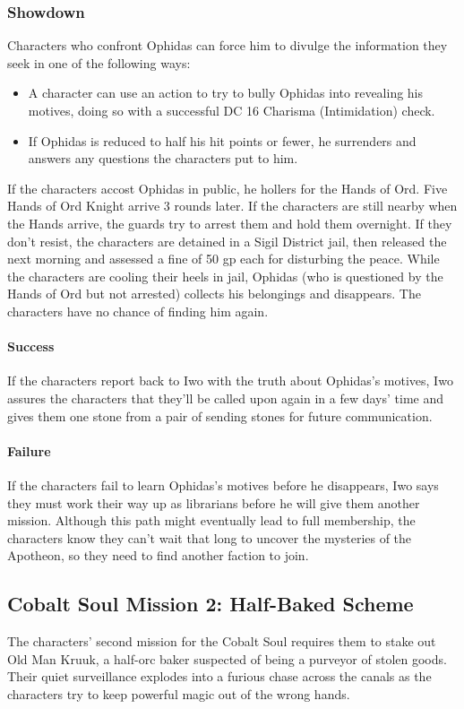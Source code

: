 \documentclass[10pt,a4paper,twoside,twocolumn,openany,nodeprecatedcode]{dndbook}
\begin{document}
\subsubsection{Showdown}
Characters who confront Ophidas can force him to divulge the information they seek in one of the following ways:


\begin{itemize}
\item A character can use an action to try to bully Ophidas into revealing his motives, doing so with a successful DC 16 Charisma (Intimidation) check.
\item If Ophidas is reduced to half his hit points or fewer, he surrenders and answers any questions the characters put to him.
\end{itemize}

If the characters accost Ophidas in public, he hollers for the Hands of Ord. Five Hands of Ord Knight arrive 3 rounds later. If the characters are still nearby when the Hands arrive, the guards try to arrest them and hold them overnight. If they don't resist, the characters are detained in a Sigil District jail, then released the next morning and assessed a fine of 50 gp each for disturbing the peace. While the characters are cooling their heels in jail, Ophidas (who is questioned by the Hands of Ord but not arrested) collects his belongings and disappears. The characters have no chance of finding him again.

\paragraph{Success}
If the characters report back to Iwo with the truth about Ophidas's motives, Iwo assures the characters that they'll be called upon again in a few days' time and gives them one stone from a pair of sending stones for future communication.

\paragraph{Failure}
If the characters fail to learn Ophidas's motives before he disappears, Iwo says they must work their way up as librarians before he will give them another mission. Although this path might eventually lead to full membership, the characters know they can't wait that long to uncover the mysteries of the Apotheon, so they need to find another faction to join.

\subsection{Cobalt Soul Mission 2: Half-Baked Scheme}
The characters' second mission for the Cobalt Soul requires them to stake out Old Man Kruuk, a half-orc baker suspected of being a purveyor of stolen goods. Their quiet surveillance explodes into a furious chase across the canals as the characters try to keep powerful magic out of the wrong hands.
\end{document}
